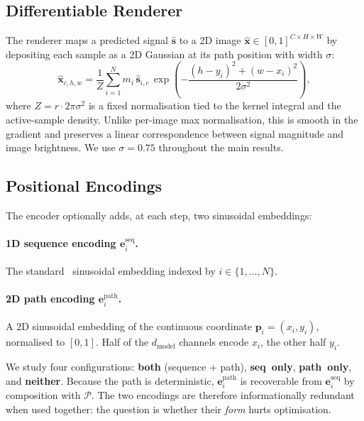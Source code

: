 \documentclass[conference,a4paper]{IEEEtran}
\begin{document}
\subsection{Differentiable Renderer}\label{ssec:renderer}

The renderer maps a predicted signal $\hat{\mathbf{s}}$ to a 2D image
$\hat{\mathbf{x}}\in[0,1]^{C\times H\times W}$ by depositing each
sample as a 2D Gaussian at its path position with width $\sigma$:
\begin{equation}
  \hat{\mathbf{x}}_{c,h,w} = \frac{1}{Z}\sum_{i=1}^N m_i \, \hat{\mathbf{s}}_{i,c} \,
    \exp\!\left(-\frac{(h-y_i)^2 + (w-x_i)^2}{2\sigma^2}\right),
\end{equation}
where $Z = r \cdot 2\pi\sigma^2$ is a fixed normalisation tied to
the kernel integral and the active-sample density. Unlike
per-image max normalisation, this is smooth in the gradient and
preserves a linear correspondence between signal magnitude and
image brightness. We use $\sigma=0.75$ throughout the main
results.

\subsection{Positional Encodings}\label{ssec:pe}

The encoder optionally adds, at each step, two sinusoidal
embeddings:

\paragraph{1D sequence encoding $\mathbf{e}^{\text{seq}}_i$.}
The standard~\cite{vaswani2017attention} sinusoidal embedding
indexed by $i\in\{1,\ldots,N\}$.

\paragraph{2D path encoding $\mathbf{e}^{\text{path}}_i$.}
A 2D sinusoidal embedding of the continuous coordinate
$\mathbf{p}_i=(x_i,y_i)$, normalised to $[0,1]$. Half of the
$d_{\text{model}}$ channels encode $x_i$, the other half $y_i$.

We study four configurations: \textbf{both} (sequence + path),
\textbf{seq~only}, \textbf{path~only}, and \textbf{neither}.
Because the path is deterministic, $\mathbf{e}^{\text{path}}_i$
is recoverable from $\mathbf{e}^{\text{seq}}_i$ by composition with
$\mathcal{P}$. The two encodings are therefore informationally
redundant when used together: the question is whether their
\emph{form} hurts optimisation.
\end{document}
